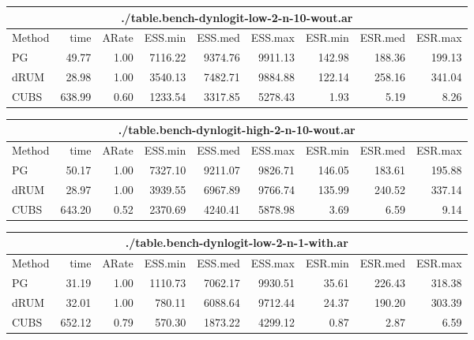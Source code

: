 \documentclass[11pt]{article}
\begin{document}
\begin{table}
\begin{tabular}{l r r r r r r r r } 
\hline
\multicolumn{9}{c}{./table.bench-dynlogit-low-2-n-10-wout.ar} \\
\hline
          Method  &     time &    ARate &  ESS.min &  ESS.med &  ESS.max &  ESR.min &  ESR.med &  ESR.max \\ 
              PG  &    49.77 &     1.00 &  7116.22 &  9374.76 &  9911.13 &   142.98 &   188.36 &   199.13 \\ 
            dRUM  &    28.98 &     1.00 &  3540.13 &  7482.71 &  9884.88 &   122.14 &   258.16 &   341.04 \\ 
            CUBS  &   638.99 &     0.60 &  1233.54 &  3317.85 &  5278.43 &     1.93 &     5.19 &     8.26
 \end{tabular}

\begin{tabular}{l r r r r r r r r } 
\hline
\multicolumn{9}{c}{./table.bench-dynlogit-high-2-n-10-wout.ar} \\
\hline
          Method  &     time &    ARate &  ESS.min &  ESS.med &  ESS.max &  ESR.min &  ESR.med &  ESR.max \\ 
              PG  &    50.17 &     1.00 &  7327.10 &  9211.07 &  9826.71 &   146.05 &   183.61 &   195.88 \\ 
            dRUM  &    28.97 &     1.00 &  3939.55 &  6967.89 &  9766.74 &   135.99 &   240.52 &   337.14 \\ 
            CUBS  &   643.20 &     0.52 &  2370.69 &  4240.41 &  5878.98 &     3.69 &     6.59 &     9.14
 \end{tabular}

\begin{tabular}{l r r r r r r r r } 
\hline
\multicolumn{9}{c}{./table.bench-dynlogit-low-2-n-1-with.ar} \\
\hline
          Method  &     time &    ARate &  ESS.min &  ESS.med &  ESS.max &  ESR.min &  ESR.med &  ESR.max \\ 
              PG  &    31.19 &     1.00 &  1110.73 &  7062.17 &  9930.51 &    35.61 &   226.43 &   318.38 \\ 
            dRUM  &    32.01 &     1.00 &   780.11 &  6088.64 &  9712.44 &    24.37 &   190.20 &   303.39 \\ 
            CUBS  &   652.12 &     0.79 &   570.30 &  1873.22 &  4299.12 &     0.87 &     2.87 &     6.59
 \end{tabular}


\end{table}
\end{document}
